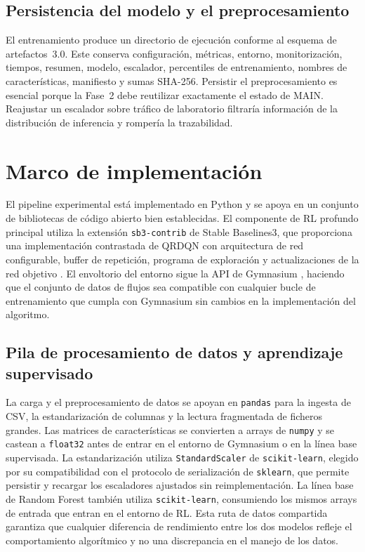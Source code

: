 \subsection{Persistencia del modelo y el preprocesamiento}
El entrenamiento produce un directorio de ejecución conforme al esquema de artefactos~3.0. Este conserva configuración, métricas, entorno, monitorización, tiempos, resumen, modelo, escalador, percentiles de entrenamiento, nombres de características, manifiesto y sumas SHA-256. Persistir el preprocesamiento es esencial porque la Fase~2 debe reutilizar exactamente el estado de MAIN. Reajustar un escalador sobre tráfico de laboratorio filtraría información de la distribución de inferencia y rompería la trazabilidad.

\section{Marco de implementación}
El pipeline experimental está implementado en Python y se apoya en un conjunto de bibliotecas de código abierto bien establecidas. El componente de RL profundo principal utiliza la extensión \texttt{sb3-contrib} de Stable Baselines3, que proporciona una implementación contrastada de QRDQN con arquitectura de red configurable, buffer de repetición, programa de exploración y actualizaciones de la red objetivo \parencite{SB3ContribQRDQNDocs}. El envoltorio del entorno sigue la API de Gymnasium \parencite{GymnasiumDocs}, haciendo que el conjunto de datos de flujos sea compatible con cualquier bucle de entrenamiento que cumpla con Gymnasium sin cambios en la implementación del algoritmo.

\subsection{Pila de procesamiento de datos y aprendizaje supervisado}
La carga y el preprocesamiento de datos se apoyan en \texttt{pandas} para la ingesta de CSV, la estandarización de columnas y la lectura fragmentada de ficheros grandes. Las matrices de características se convierten a arrays de \texttt{numpy} y se castean a \texttt{float32} antes de entrar en el entorno de Gymnasium o en la línea base supervisada. La estandarización utiliza \texttt{StandardScaler} de \texttt{scikit-learn}, elegido por su compatibilidad con el protocolo de serialización de \texttt{sklearn}, que permite persistir y recargar los escaladores ajustados sin reimplementación. La línea base de Random Forest también utiliza \texttt{scikit-learn}, consumiendo los mismos arrays de entrada que entran en el entorno de RL. Esta ruta de datos compartida garantiza que cualquier diferencia de rendimiento entre los dos modelos refleje el comportamiento algorítmico y no una discrepancia en el manejo de los datos.

